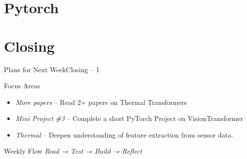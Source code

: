 \documentclass{beamer}
\begin{document}
	\section{Pytorch}

	\section{Closing}
		\begin{frame}{Plans for Next Week}{Closing – 1}
			\begin{block}{Focus Areas}
				\vspace{-0.3em}
				\begin{itemize}
					\item \textit{More papers} – Read 2+ papers on Thermal Transformers 
					\item \textit{Mini Project \#3} – Complete a short PyTorch Project on VisionTransformer
					\item \textit{Thermal} – Deepen understanding of feature extraction from sensor data.
				\end{itemize}
			\end{block}
			\vspace{1em}
			\begin{block}{Weekly Flow}
				\textit{Read → Test → Build → Reflect}
			\end{block}
		\end{frame}
		
\end{document}
